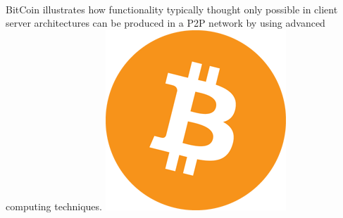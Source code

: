 \documentclass[11pt]{amsart}
\begin{document}
\paragraph{}
BitCoin illustrates how functionality typically thought only possible in client server architectures can be produced in a P2P network by using advanced computing techniques.
\includegraphics[scale=.5]{bitcoin}




\end{document}
